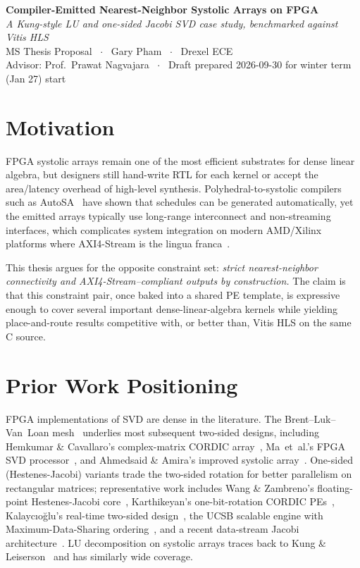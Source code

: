 \documentclass[11pt,letterpaper]{article}
\begin{document}
\begin{center}
  {\LARGE \bfseries Compiler-Emitted Nearest-Neighbor Systolic Arrays on FPGA}\\[0.4em]
  {\itshape A Kung-style LU and one-sided Jacobi SVD case study, benchmarked against Vitis HLS}\\[0.8em]
  {\normalsize MS Thesis Proposal \ $\cdot$ \ Gary Pham \ $\cdot$ \ Drexel ECE}\\
  {\normalsize Advisor: Prof.\ Prawat Nagvajara \ $\cdot$ \ Draft prepared 2026-09-30 for winter term (Jan 27) start}
\end{center}

\vspace{0.4em}

\section{Motivation}

FPGA systolic arrays remain one of the most efficient substrates for dense linear algebra, but designers still hand-write RTL for each kernel or accept the area/latency overhead of high-level synthesis. Polyhedral-to-systolic compilers such as AutoSA~\cite{autosa} have shown that schedules can be generated automatically, yet the emitted arrays typically use long-range interconnect and non-streaming interfaces, which complicates system integration on modern AMD/Xilinx platforms where AXI4-Stream is the lingua franca~\cite{ug1399,ug761}.

This thesis argues for the opposite constraint set: \emph{strict nearest-neighbor connectivity and AXI4-Stream--compliant outputs by construction.} The claim is that this constraint pair, once baked into a shared PE template, is expressive enough to cover several important dense-linear-algebra kernels while yielding place-and-route results competitive with, or better than, Vitis HLS on the same C source.

\section{Prior Work Positioning}

FPGA implementations of SVD are dense in the literature. The Brent--Luk--Van~Loan mesh~\cite{brentluk1985} underlies most subsequent two-sided designs, including Hemkumar \& Cavallaro's complex-matrix CORDIC array~\cite{hemkumar1994}, Ma~et~al.'s FPGA SVD processor~\cite{ma2006}, and Ahmedsaid \& Amira's improved systolic array~\cite{ahmedsaid2003}. One-sided (Hestenes-Jacobi) variants trade the two-sided rotation for better parallelism on rectangular matrices; representative work includes Wang \& Zambreno's floating-point Hestenes-Jacobi core~\cite{wang2014}, Karthikeyan's one-bit-rotation CORDIC PEs~\cite{karthikeyan2013}, Kalayc{\i}o\u{g}lu's real-time two-sided design~\cite{kalaycioglu2019}, the UCSB scalable engine with Maximum-Data-Sharing ordering~\cite{liu2020}, and a recent data-stream Jacobi architecture~\cite{dsbjacobi2025}. LU decomposition on systolic arrays traces back to Kung \& Leiserson~\cite{kung1979} and has similarly wide coverage.
\end{document}

